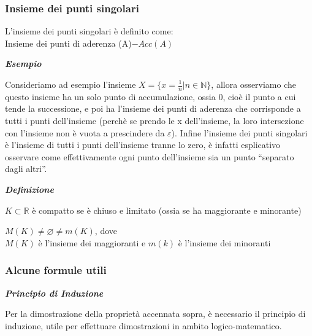 \documentclass{article}
\theoremstyle{definition}
\newcommand{\N}{\mathbb{N}}
\newcommand{\virgolette}[1]{``#1''}
\begin{document}
\subsubsection{Insieme dei punti singolari}
L'insieme dei punti singolari è definito come:
\\ Insieme dei punti di aderenza (A)$-Acc(A)$
\begin{center}
    \textbf{\textit{Esempio}}
\end{center}
Consideriamo ad esempio l'insieme $X=\{x=\frac{1}{n} | n \in \N\}$, allora osserviamo che questo insieme ha un solo punto di accumulazione, ossia $0$, cioè il punto a cui tende la successione, e poi ha l'insieme dei punti di aderenza che corrisponde a tutti i punti dell'insieme (perchè se prendo le x dell'insieme, la loro intersezione con l'insieme non è vuota a prescindere da $\varepsilon$). Infine l'insieme dei punti singolari è l'insieme di tutti i punti dell'insieme tranne lo zero, è infatti esplicativo osservare come effettivamente ogni punto dell'insieme sia un punto \virgolette{separato dagli altri}. 
\begin{center}
    \textbf{\textit{Definizione}}
\end{center}
$K \subset \mathbb{R}$ è compatto se è chiuso e limitato (ossia se ha maggiorante e minorante)
\begin{center}
    $M(K) \neq \varnothing \neq m(K)$, dove
    \\ $M(K)$ è l'insieme dei maggioranti e $m(k)$ è l'insieme dei minoranti
\end{center}

\subsubsection{Alcune formule utili}

\begin{center}
    \textbf{\textit{Principio di Induzione}}
\end{center}
Per la dimostrazione della proprietà accennata sopra, è necessario il principio di induzione, utile per effettuare dimostrazioni in ambito logico-matematico.
\end{document}
